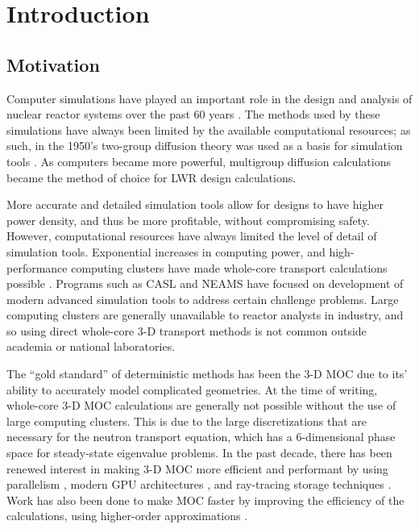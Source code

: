 \chapter{Introduction}{\label{ch:Introduction}
  \section{Motivation}{\label{sec:Introduction:Motivation}
    Computer simulations have played an important role in the design and analysis of nuclear reactor systems over the past 60 years \cite{FewGroupDiffusion}.
    The methods used by these simulations have always been limited by the available computational resources; as such, in the 1950's two-group diffusion theory was used as a basis for simulation tools \cite{FewGroupDiffusion}.
    As computers became more powerful, multigroup diffusion calculations became the method of choice for \ac{LWR} design calculations.

    More accurate and detailed simulation tools allow for designs to have higher power density, and thus be more profitable, without compromising safety.
    However, computational resources have always limited the level of detail of simulation tools.
    Exponential increases in computing power, and high-performance computing clusters have made whole-core transport calculations possible \cite{CASMO-4,Apollo2-2010,DeCART,Denovo,Yang2010,Boyd2014,Collins2016,Gunow2018}.
    Programs such as \ac{CASL} and \ac{NEAMS} have focused on development of modern advanced simulation tools to address certain challenge problems.
    Large computing clusters are generally unavailable to reactor analysts in industry, and so using direct whole-core 3-D transport methods is not common outside academia or national laboratories.

    The ``gold standard'' of deterministic methods has been the 3-D \ac{MOC} \cite{Askew1972} due to its' ability to accurately model complicated geometries.
    At the time of writing, whole-core 3-D \ac{MOC} calculations are generally not possible without the use of large computing clusters.
    This is due to the large discretizations that are necessary for the neutron transport equation, which has a 6-dimensional phase space for steady-state eigenvalue problems.
    In the past decade, there has been renewed interest in making 3-D \ac{MOC} more efficient and performant by using parallelism \cite{Kochunas2013}, modern \ac{GPU} architectures \cite{Boyd2014}, and ray-tracing storage techniques \cite{Sciannandrone2016, Gunow2016}.
    Work has also been done to make \ac{MOC} faster by improving the efficiency of the calculations, using higher-order approximations \cite{Ferrer2016,Gunow2018}.

}}
